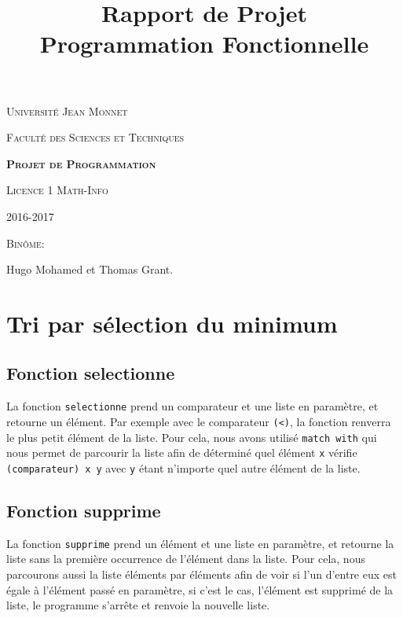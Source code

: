 \documentclass[a4paper, 11pt]{article}
\title{Rapport de Projet 
\\ Programmation Fonctionnelle}
\date{}
\begin{document}
\begin{titlepage}
\center

{\Large \textsc{Université Jean Monnet}}

\vspace*{1cm}

{\Large \textsc{Faculté des Sciences et Techniques}}

\vfill

{\huge \bf \textsc{Projet de Programmation}}

\vspace*{1cm}

{\Large \textsc{Licence 1 Math-Info}}


{\large 2016-2017}

\vfill


\vspace*{0.5cm}

{\large \textsc{Binôme:}}

\vspace*{0.5cm}

Hugo Mohamed et Thomas Grant.

\end{titlepage}

\newpage
\tableofcontents
\newpage

\section{Tri par sélection du minimum}
\subsection{Fonction selectionne}
La fonction \texttt{selectionne} prend un comparateur et une liste en paramètre, et retourne un élément. Par exemple avec le comparateur \texttt{(<)}, la fonction renverra le plus petit élément de la liste.
Pour cela, nous avons utilisé \texttt{match with} qui nous permet de parcourir la liste afin de déterminé quel élément \texttt{x} vérifie \texttt{(comparateur) x y} avec \texttt{y} étant n'importe quel autre élément de la liste.
\subsection{Fonction supprime}
La fonction \texttt{supprime} prend un élément et une liste en paramètre, et retourne la liste sans la première occurrence de l'élément dans la liste. Pour cela, nous parcourons aussi la liste éléments par éléments afin de voir si l'un d'entre eux est égale à l'élément passé en paramètre, si c'est le cas, l'élément est supprimé de la liste, le programme s'arrête et renvoie la nouvelle liste.
\end{document}
